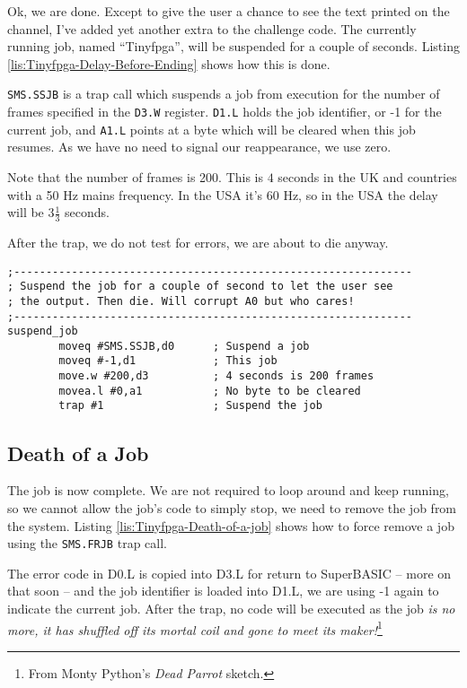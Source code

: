 Ok, we are done. Except to give the user a chance to see the text
printed on the channel, I've added yet another extra to the challenge
code. The currently running job, named ``Tinyfpga'', will be suspended
for a couple of seconds. Listing \ref{lis:Tinyfpga-Delay-Before-Ending}
shows how this is done.

\texttt{SMS.SSJB} is a trap call which suspends a job from execution
for the number of frames specified in the \texttt{D3.W} register.
\texttt{D1.L} holds the job identifier, or -1 for the current job,
and \texttt{A1.L} points at a byte which will be cleared when this
job resumes. As we have no need to signal our reappearance, we use
zero.

Note that the number of frames is 200. This is $4$ seconds in the
UK and countries with a 50 Hz mains frequency. In the USA it's 60
Hz, so in the USA the delay will be $3\frac{1}{3}$ seconds.

After the trap, we do not test for errors, we are about to die anyway.

\begin{lstlisting}[caption={Tinyfpga - Delay Before Ending},label={lis:Tinyfpga-Delay-Before-Ending}]
;--------------------------------------------------------------
; Suspend the job for a couple of second to let the user see
; the output. Then die. Will corrupt A0 but who cares!
;--------------------------------------------------------------
suspend_job
        moveq #SMS.SSJB,d0      ; Suspend a job
        moveq #-1,d1            ; This job
        move.w #200,d3          ; 4 seconds is 200 frames
        movea.l #0,a1           ; No byte to be cleared
        trap #1                 ; Suspend the job

\end{lstlisting}


\subsection{Death of a Job}

The job is now complete. We are not required to loop around and keep
running, so we cannot allow the job's code to simply stop, we need
to remove the job from the system. Listing \ref{lis:Tinyfpga-Death-of-a-job}
shows how to force remove a job using the \texttt{SMS.FRJB} trap call.

The error code in D0.L is copied into D3.L for return to SuperBASIC
-- more on that soon -- and the job identifier is loaded into D1.L,
we are using -1 again to indicate the current job. After the trap,
no code will be executed as the job \emph{is no more, it has shuffled
off its mortal coil and gone to meet its maker!}\footnote{From Monty Python's \emph{Dead Parrot} sketch.}

